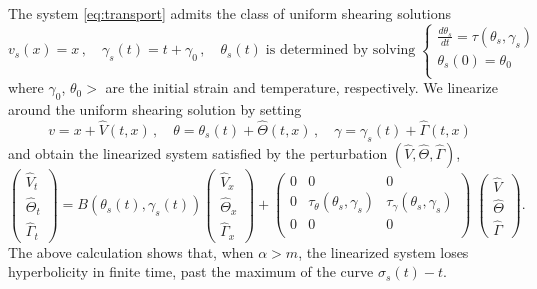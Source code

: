 \documentclass[11pt]{article}
\theoremstyle{remark}
\begin{document}
The system  \eqref{eq:transport} admits the class of uniform shearing solutions
\begin{equation} \label{app-uss}
v_s (x) = x \, , \quad \gamma_s (t) = t + \gamma_0 \, , \quad \theta_s (t)  \; \mbox{is determined by solving}  \;
\begin{cases} \frac{d\theta_s}{dt} = \tau (\theta_s, \gamma_s) & \\
\theta_s (0) = \theta_0 & \\
\end{cases}
\end{equation}
where $\gamma_0$, $\theta_0 >$ are the initial strain and temperature, respectively. We linearize around the uniform shearing solution by setting
$$
v = x + \hat V(t,x) \, , \quad \theta = \theta_s (t) + \hat\Theta (t,x) \, , \quad \gamma = \gamma_s (t) + \hat\Gamma (t,x)
$$
and obtain the linearized system satisfied by the perturbation $(\hat V, \hat\Theta, \hat\Gamma )$,
\begin{equation}  %
 \begin{pmatrix} \hat V_t \\ \hat\Theta_t \\ \hat\Gamma_t \end{pmatrix} =  B (\theta_s(t) , \gamma_s (t) )  \begin{pmatrix} \hat V_x  \\ \hat\Theta_x \\  \hat\Gamma_x  \end{pmatrix}
 +
 \begin{pmatrix}
  0 & 0 & 0 \\
 0 & \tau_\theta (\theta_s , \gamma_s ) & \tau_\gamma (\theta_s , \gamma_s ) \\
 0 & 0 & 0 \\
 \end{pmatrix} \;
  \begin{pmatrix} \hat V  \\ \hat\Theta \\  \hat\Gamma  \end{pmatrix}.
\end{equation}
The above calculation shows that, when $\alpha > m$,  the linearized system
loses hyperbolicity in finite time, past the maximum of the curve $\sigma_s (t) - t$.
\end{document}
